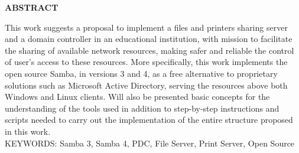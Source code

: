 \begin{center}
\textbf{ABSTRACT}
\end{center}

\singlespacing

\noindent This work suggests a proposal to implement a files and printers sharing server and a domain controller in an educational institution, with mission to facilitate the sharing of available network
resources, making safer and reliable the control of user’s access to these resources. More specifically, this work implements the open source Samba, in versions 3 and 4, as a free alternative to 
proprietary solutions such as Microsoft Active Directory, serving the resources above both Windows and Linux clients. Will also be presented basic concepts for the understanding of the tools 
used in addition to step-by-step instructions and scripts needed to carry out the implementation of the entire structure proposed in this work.\\

\noindent KEYWORDS:  Samba 3, Samba 4, PDC, File Server, Print Server, Open Source